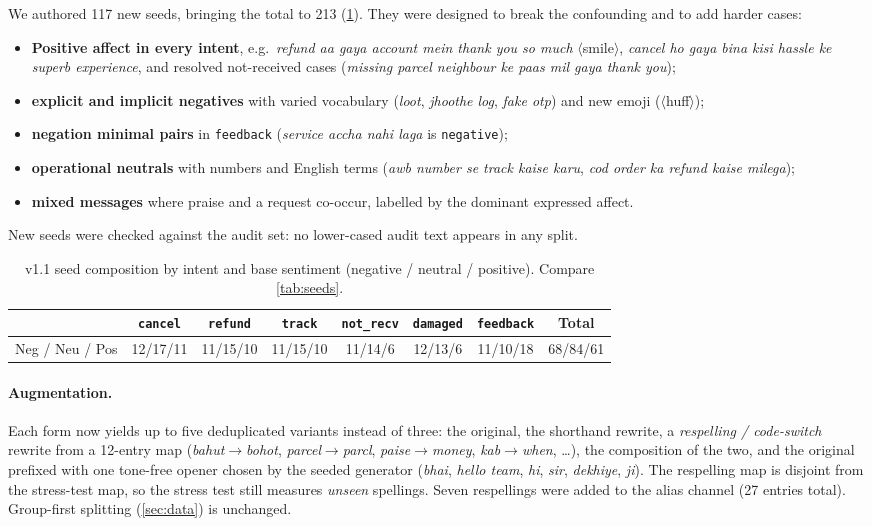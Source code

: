 \documentclass[11pt,a4paper]{article}
\theoremstyle{remark}
\newcommand{\lbl}[1]{\texttt{#1}}                      %
\newcommand{\hi}[1]{\textit{#1}}                       %
\newcommand{\emo}[1]{\textsf{\small$\langle$#1$\rangle$}} %
\begin{document}
We authored 117 new seeds, bringing the total to 213
(\cref{tab:v11seeds}). They were designed to break the confounding and to add
harder cases:
\begin{itemize}
  \item \textbf{Positive affect in every intent}, e.g.\ \hi{refund aa gaya
        account mein thank you so much} \emo{smile}, \hi{cancel ho gaya bina
        kisi hassle ke superb experience}, and resolved not-received cases
        (\hi{missing parcel neighbour ke paas mil gaya thank you});
  \item \textbf{explicit and implicit negatives} with varied vocabulary
        (\hi{loot}, \hi{jhoothe log}, \hi{fake otp}) and new emoji
        (\emo{huff});
  \item \textbf{negation minimal pairs} in \lbl{feedback}
        (\hi{service accha nahi laga} is \lbl{negative});
  \item \textbf{operational neutrals} with numbers and English terms
        (\hi{awb number se track kaise karu}, \hi{cod order ka refund kaise milega});
  \item \textbf{mixed messages} where praise and a request co-occur, labelled
        by the dominant expressed affect.
\end{itemize}
New seeds were checked against the audit set: no lower-cased audit text
appears in any split.

\begin{table}[h]
\centering\small
\caption{v1.1 seed composition by intent and base sentiment (negative / neutral / positive). Compare \cref{tab:seeds}.}
\label{tab:v11seeds}
\begin{tabular}{@{}lcccccc|c@{}}
\toprule
 & \lbl{cancel} & \lbl{refund} & \lbl{track} & \lbl{not\_recv} & \lbl{damaged} & \lbl{feedback} & Total \\
\midrule
Neg / Neu / Pos & 12/17/11 & 11/15/10 & 11/15/10 & 11/14/6 & 12/13/6 & 11/10/18 & 68/84/61 \\
\bottomrule
\end{tabular}
\end{table}

\paragraph{Augmentation.} Each form now yields up to five deduplicated variants
instead of three: the original, the shorthand rewrite, a \emph{respelling /
code-switch} rewrite from a 12-entry map (\hi{bahut}$\to$\hi{bohot},
\hi{parcel}$\to$\hi{parcl}, \hi{paise}$\to$\hi{money}, \hi{kab}$\to$\hi{when},
\dots), the composition of the two, and the original prefixed with one
tone-free opener chosen by the seeded generator (\hi{bhai}, \hi{hello team},
\hi{hi}, \hi{sir}, \hi{dekhiye}, \hi{ji}). The respelling map is disjoint from
the stress-test map, so the stress test still measures \emph{unseen} spellings.
Seven respellings were added to the alias channel (27 entries total).
Group-first splitting (\cref{sec:data}) is unchanged.
\end{document}
